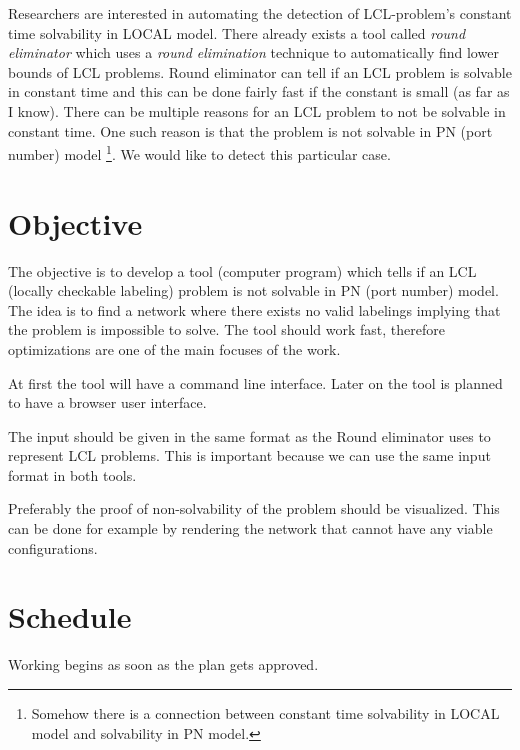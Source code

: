 \documentclass[12pt,a4paper,english,oneside]{article}
\begin{document}
Researchers are interested in automating the detection of LCL-problem's constant time solvability in LOCAL model.
There already exists a tool called \emph{round eliminator} \cite{DBLP:conf/podc/Olivetti20} which uses a \emph{round elimination} \cite{DBLP:conf/podc/Brandt19} technique to automatically find lower bounds of LCL problems.
Round eliminator can tell if an LCL problem is solvable in constant time and this can be done fairly fast if the constant is small (as far as I know).
There can be multiple reasons for an LCL problem to not be solvable in constant time.
One such reason is that the problem is not solvable in PN (port number) model
\footnote{Somehow there is a connection between constant time solvability in LOCAL model and solvability in PN model.}.
We would like to detect this particular case.


\section*{Objective}
The objective is to develop a tool (computer program) which tells if an LCL (locally checkable labeling) problem is not solvable in PN (port number) model.
The idea is to find a network where there exists no valid labelings implying that the problem is impossible to solve.
The tool should work fast, therefore optimizations are one of the main focuses of the work.

At first the tool will have a command line interface.
Later on the tool is planned to have a browser user interface.

The input should be given in the same format as the Round eliminator uses to represent LCL problems.
This is important because we can use the same input format in both tools.

Preferably the proof of non-solvability of the problem should be visualized.
This can be done for example by rendering the network that cannot have any viable configurations.

\section*{Schedule}

Working begins as soon as the plan gets approved.

\printbibliography
\end{document}

